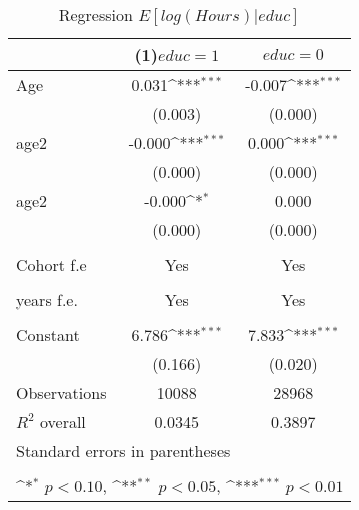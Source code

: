 \begin{table}[htbp]\centering
\def\sym#1{\ifmmode^{#1}\else\(^{#1}\)\fi}
\caption{Regression \(E[log(Hours)|educ]\) \label{Tab:reg3}}
\begin{tabular}{l*{2}{c}}
\toprule
                    &\multicolumn{1}{c}{(1)\(educ=1\)\label{Reg:3_h}}         &\multicolumn{1}{c}{\(educ=0\)\label{Reg:3_l}}         \\
\midrule
Age                 &       0.031\sym{***}&      -0.007\sym{***}\\
                    &     (0.003)         &     (0.000)         \\
\addlinespace
age2                &      -0.000\sym{***}&       0.000\sym{***}\\
                    &     (0.000)         &     (0.000)         \\
\addlinespace
age2                &      -0.000\sym{*}  &       0.000         \\
                    &     (0.000)         &     (0.000)         \\
\\
Cohort f.e           &       Yes        &      Yes \\
                            \\
\addlinespace
years f.e.            &       Yes         &       Yes         \\
                           \\
\addlinespace
Constant            &       6.786\sym{***}&       7.833\sym{***}\\
                    &     (0.166)         &     (0.020)         \\
\midrule
Observations        &       10088         &       28968         \\
$R^2$ overall       &   0.0345&0.3897 \\
\bottomrule
\multicolumn{3}{l}{\footnotesize Standard errors in parentheses}\\
\multicolumn{3}{l}{\footnotesize }\\
\multicolumn{3}{l}{\footnotesize \sym{*} \(p<0.10\), \sym{**} \(p<0.05\), \sym{***} \(p<0.01\)}\\
\end{tabular}
\end{table}
